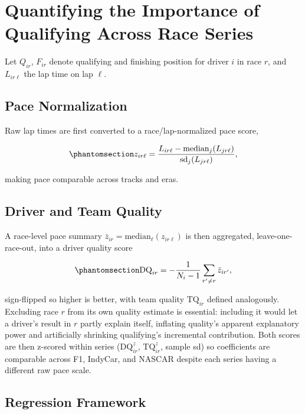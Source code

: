 \documentclass[
  10pt]{article}
\begin{document}
\section{Quantifying the Importance of Qualifying Across Race
Series}\label{quantifying-the-importance-of-qualifying-across-race-series}

Let \(Q_{ir}\), \(F_{ir}\) denote qualifying and finishing position for
driver \(i\) in race \(r\), and \(L_{ir\ell}\) the lap time on lap
\(\ell\).

\subsection{Pace Normalization}\label{pace-normalization}

Raw lap times are first converted to a race/lap-normalized pace score,

\begin{equation}\protect\phantomsection\label{eq-pace}{
z_{ir\ell} = \frac{L_{ir\ell} - \text{median}_j(L_{jr\ell})}{\text{sd}_j(L_{jr\ell})},
}\end{equation}

making pace comparable across tracks and eras.

\subsection{Driver and Team Quality}\label{driver-and-team-quality}

A race-level pace summary
\(\bar z_{ir} = \text{median}_\ell(z_{ir\ell})\) is then aggregated,
leave-one-race-out, into a driver quality score

\begin{equation}\protect\phantomsection\label{eq-driver-quality}{
\text{DQ}_{ir} = -\frac{1}{N_i-1}\sum_{r'\neq r}\bar z_{ir'},
}\end{equation}

sign-flipped so higher is better, with team quality \(\text{TQ}_{ir}\)
defined analogously. Excluding race \(r\) from its own quality estimate
is essential: including it would let a driver's result in \(r\) partly
explain itself, inflating quality's apparent explanatory power and
artificially shrinking qualifying's incremental contribution. Both
scores are then z-scored within series (\(\text{DQ}^z_{ir}\),
\(\text{TQ}^z_{ir}\), sample sd) so coefficients are comparable across
F1, IndyCar, and NASCAR despite each series having a different raw pace
scale.

\subsection{Regression Framework}\label{regression-framework}
\end{document}
